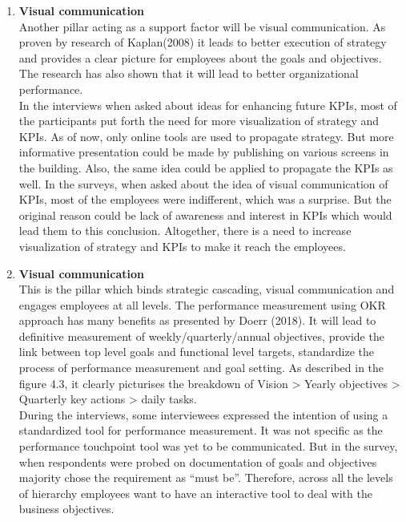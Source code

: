 \begin{enumerate}
\begin{enumerate}
    \item \textbf{Visual communication}\\
    Another pillar acting as a support factor will be visual communication. As proven by research of Kaplan(2008) it leads to better execution of strategy and provides a clear picture for employees about the goals and objectives. The research has also shown that it will lead to better organizational performance. \\
    In the interviews when asked about ideas for enhancing future KPIs, most of the participants put forth the need for more visualization of strategy and KPIs. As of now, only online tools are used to propagate strategy. But more informative presentation could be made by publishing on various screens in the building. Also, the same idea could be applied to propagate the KPIs as well. In the surveys, when asked about the idea of visual communication of KPIs, most of the employees were indifferent, which was a surprise. But the original reason could be lack of awareness and interest in KPIs which would lead them to this conclusion. Altogether, there is a need to increase visualization of strategy and KPIs to make it reach the employees.\\
    
    \item \textbf{Visual communication}\\
    This is the pillar which binds strategic cascading, visual communication and engages employees at all levels. The performance measurement using OKR approach has many benefits as presented by Doerr (2018). It will lead to definitive measurement of weekly/quarterly/annual objectives, provide the link between top level goals and functional level targets, standardize the process of performance measurement and goal setting. As described in the figure 4.3, it clearly picturises the breakdown of Vision > Yearly objectives > Quarterly key actions > daily tasks.\\
    During the interviews, some interviewees expressed the intention of using a standardized tool for performance measurement. It was not specific as the performance touchpoint tool was yet to be communicated. But in the survey, when respondents were probed on documentation of goals and objectives majority chose the requirement as “must be”. Therefore, across all the levels of hierarchy employees want to have an interactive tool to deal with the business objectives.\\
\end{enumerate}

\end{enumerate}









